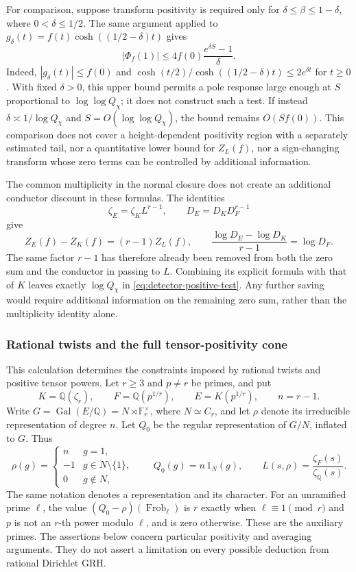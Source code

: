 \documentclass[11pt]{article}
\theoremstyle{definition}
\theoremstyle{remark}
\begin{document}
For comparison, suppose transform positivity is required only for
$\delta\leq\beta\leq1-\delta$, where $0<\delta\leq1/2$.
The same argument applied to
$g_\delta(t)=f(t)\cosh((1/2-\delta)t)$ gives
\[
 |\Phi_f(1)|\leq
 4f(0)\frac{e^{\delta S}-1}{\delta}.
\]
Indeed, $|g_\delta(t)|\leq f(0)$ and
$\cosh(t/2)/\cosh((1/2-\delta)t)\leq2e^{\delta t}$
for $t\geq0$.  With fixed $\delta>0$, this upper bound permits
a pole response large enough at $S$ proportional to
$\log\log Q_\chi$; it does not construct such a test.
If instead $\delta\asymp1/\log Q_\chi$ and
$S=O(\log\log Q_\chi)$, the bound remains $O(Sf(0))$.
This comparison does not cover a height-dependent positivity region
with a separately estimated tail, nor a quantitative lower bound
for $Z_L(f)$, nor a sign-changing transform whose zero
terms can be controlled by additional information.

The common multiplicity in the normal closure does not create an
additional conductor discount in these formulas.  The identities
\[
 \zeta_E=\zeta_K L^{r-1},\qquad D_E=D_KD_F^{r-1}
\]
give
\[
 Z_E(f)-Z_K(f)=(r-1)Z_L(f),\qquad
 \frac{\log D_E-\log D_K}{r-1}=\log D_F.
\]
The same factor $r-1$ has therefore already been removed from
both the zero sum and the conductor in passing to $L$.
Combining its explicit formula with that of $K$ leaves exactly
$\log Q_\chi$ in \eqref{eq:detector-positive-test}.
Any further saving would require additional information on the
remaining zero sum, rather than the multiplicity identity alone.

\subsubsection{Rational twists and the full tensor-positivity cone}
\label{sec:tensor-twist-audit}

This calculation determines the constraints imposed by rational twists and positive tensor powers.
Let \(r\geq3\) and \(p\ne r\) be primes, and put
\[
 K=\mathbb Q(\zeta_r),\qquad F=\mathbb Q(p^{1/r}),\qquad
 E=K(p^{1/r}),\qquad n=r-1.
\]
Write \(G=\operatorname{Gal}(E/\mathbb Q)=N\rtimes\mathbb F_r^\times\),
where \(N\simeq C_r\), and let \(\rho\) denote its irreducible
representation of degree \(n\). Let \(Q_0\) be the regular representation
of \(G/N\), inflated to \(G\). Thus
\begin{equation}\label{eq:twist-character-values}
 \rho(g)=
 \begin{cases}n&g=1,\\-1&g\in N\setminus\{1\},\\0&g\notin N,\end{cases}
 \qquad Q_0(g)=n\,1_N(g),
 \qquad
 L(s,\rho)=\frac{\zeta_F(s)}{\zeta_{\mathbb Q}(s)}.
\end{equation}
The same notation denotes a representation and its character.
For an unramified prime \(\ell\), the value
\((Q_0-\rho)(\operatorname{Frob}_\ell)\) is \(r\) exactly when
\(\ell\equiv1\pmod r\) and \(p\) is not an \(r\)-th power modulo
\(\ell\), and is zero otherwise. These are the auxiliary primes.
The assertions below concern particular positivity and averaging
arguments. They do not assert a limitation on every possible deduction
from rational Dirichlet GRH.
\end{document}
